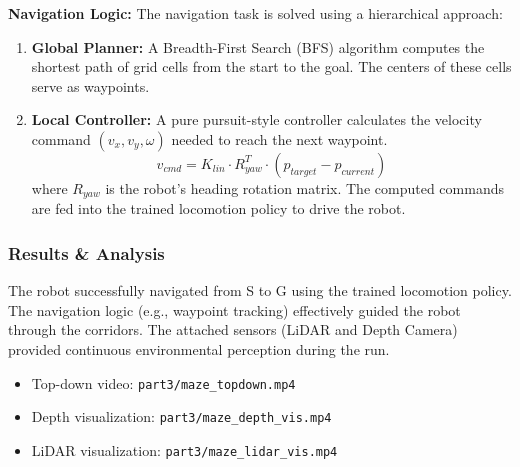 \documentclass[UTF8]{ctexart}
\begin{document}
\textbf{Navigation Logic:}
The navigation task is solved using a hierarchical approach:
\begin{enumerate}
    \item \textbf{Global Planner:} A Breadth-First Search (BFS) algorithm computes the shortest path of grid cells from the start to the goal. The centers of these cells serve as waypoints.
    \item \textbf{Local Controller:} A pure pursuit-style controller calculates the velocity command $(v_x, v_y, \omega)$ needed to reach the next waypoint.
    \begin{equation}
        v_{cmd} = K_{lin} \cdot R_{yaw}^T \cdot (p_{target} - p_{current})
    \end{equation}
    where $R_{yaw}$ is the robot's heading rotation matrix. The computed commands are fed into the trained locomotion policy to drive the robot.
\end{enumerate}
\subsubsection{Results \& Analysis}
The robot successfully navigated from S to G using the trained locomotion policy. The navigation logic (e.g., waypoint tracking) effectively guided the robot through the corridors. The attached sensors (LiDAR and Depth Camera) provided continuous environmental perception during the run.

\begin{itemize}
    \item Top-down video: \texttt{part3/maze\_topdown.mp4}
    \item Depth visualization: \texttt{part3/maze\_depth\_vis.mp4}
    \item LiDAR visualization: \texttt{part3/maze\_lidar\_vis.mp4}
\end{itemize}
\end{document}
